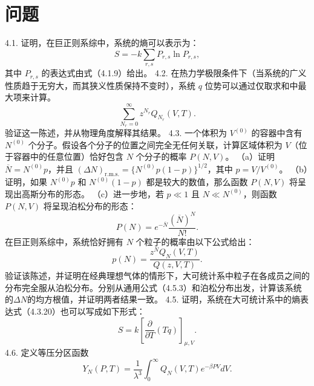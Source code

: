 \section{问题}\label{ux95eeux9898_chap4}
4.1. 证明，在巨正则系综中，系统的熵可以表示为：
\begin{equation}\tag{4.5.23}\label{eq:4.5.23}
S = - k \sum _ { r , s } P _ { r , s } \ln P _ { r , s } ,
\end{equation}
其中 \(P_{r,s}\) 的表达式由式（4.1.9）给出。
4.2. 在热力学极限条件下（当系统的广义性质趋于无穷大，而其狭义性质保持不变时），系统 \(q\) 位势可以通过仅取求和中最大项来计算。
\begin{equation}\tag{4.5.24}\label{eq:4.5.24}
\sum _ { N _ { r } = 0 } ^{\infty} z ^{N _ { r} } Q _ { N _ { r } } ( V , T ) .
\end{equation}
验证这一陈述，并从物理角度解释其结果。
4.3. 一个体积为 \(V^{(0)}\) 的容器中含有 \(N^{(0)}\) 个分子。假设各个分子的位置之间完全无任何关联，计算区域体积为 \(V\)（位于容器中的任意位置）恰好包含 \(N\) 个分子的概率 \(P(N,V)\)。
（a）证明 \(\overline{N} = N^{(0)}p\)，并且 \((\Delta N)_{\mathrm{r.m.s.}} = \{N^{(0)}p(1-p)\}^{1/2}\)，其中 \(p = V/V^{(0)}\)。
（b）证明，如果 \(N^{(0)}p\) 和 \(N^{(0)}(1-p)\) 都是较大的数值，那么函数 \(P(N,V)\) 将呈现出高斯分布的形态。
（c）进一步地，若 \(p \ll 1\) 且 \(N \ll N^{(0)}\)，则函数 \(P(N,V)\) 将呈现泊松分布的形态：
\begin{equation}\tag{4.5.25}\label{eq:4.5.25}
P ( N ) = e ^{- \overline { { N} } } \frac { ( \overline { { N } } ) ^{N} } { N ! } .
\end{equation}
在巨正则系综中，系统恰好拥有 \(N\) 个粒子的概率由以下公式给出：
\begin{equation}\tag{4.5.26}\label{eq:4.5.26}
p ( N ) = \frac { z ^{N} Q _ { N } ( V , T ) } { Q ( z , V , T ) } .
\end{equation}
验证该陈述，并证明在经典理想气体的情形下，大可统计系中粒子在各成员之间的分布完全服从泊松分布。分别从通用公式（4.5.3）和泊松分布出发，计算该系统的\(\Delta N\)的均方根值，并证明两者结果一致。
4.5. 证明，系统在大可统计系中的熵表达式（4.3.20）也可以写成如下形式：
\begin{equation}\tag{4.5.27}\label{eq:4.5.27}
S = k \left[ \frac { \partial } { \partial T } ( T q ) \right] _ { \mu , V } .
\end{equation}
4.6. 定义等压分区函数
\begin{equation}\tag{4.5.28}\label{eq:4.5.28}
Y _ { N } ( P , T ) = \frac { 1 } { \lambda ^{3} } \int _ { 0 } ^{\infty} Q _ { N } ( V , T ) e ^{- \beta P V} d V .
\end{equation}
